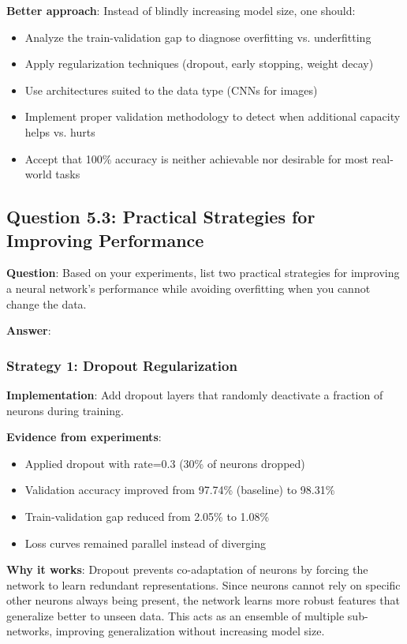 \textbf{Better approach}: Instead of blindly increasing model size, one should:
\begin{itemize}
    \item Analyze the train-validation gap to diagnose overfitting vs. underfitting
    \item Apply regularization techniques (dropout, early stopping, weight decay)
    \item Use architectures suited to the data type (CNNs for images)
    \item Implement proper validation methodology to detect when additional capacity helps vs. hurts
    \item Accept that 100\% accuracy is neither achievable nor desirable for most real-world tasks
\end{itemize}

\subsection{Question 5.3: Practical Strategies for Improving Performance}

\textbf{Question}: Based on your experiments, list two practical strategies for improving a neural network's performance while avoiding overfitting when you cannot change the data.

\textbf{Answer}:

\subsubsection{Strategy 1: Dropout Regularization}

\textbf{Implementation}: Add dropout layers that randomly deactivate a fraction of neurons during training.

\textbf{Evidence from experiments}:
\begin{itemize}
    \item Applied dropout with rate=0.3 (30\% of neurons dropped)
    \item Validation accuracy improved from 97.74\% (baseline) to 98.31\%
    \item Train-validation gap reduced from 2.05\% to 1.08\%
    \item Loss curves remained parallel instead of diverging
\end{itemize}

\textbf{Why it works}: Dropout prevents co-adaptation of neurons by forcing the network to learn redundant representations. Since neurons cannot rely on specific other neurons always being present, the network learns more robust features that generalize better to unseen data. This acts as an ensemble of multiple sub-networks, improving generalization without increasing model size.

